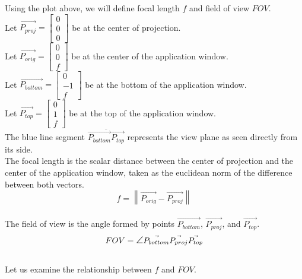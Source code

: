 \documentclass[11.pt]{article}
\begin{document}
Using the plot above, we will define focal length $f$ and
field of view $FOV$.\\

Let $\vec{P_{proj}}=\begin{bmatrix} 0\\ 0\\ 0\end{bmatrix}$ be at the center
of projection.\\[5pt]

Let $\vec{P_{orig}}=\begin{bmatrix} 0\\ 0\\ f\end{bmatrix}$ be at the center of the
application window.\\[5pt]

Let $\vec{P_{bottom}}=\begin{bmatrix} 0\\ -1\\ f\end{bmatrix}$ be at the bottom of the
application window.\\[5pt]

Let $\vec{P_{top}}=\begin{bmatrix} 0\\ 1\\ f\end{bmatrix}$ be at the top of the
application window.\\[5pt]

The blue line segment $\overline{\vec{P_{bottom}}\vec{P_{top}}}$ represents the view
plane as seen directly from its side.\\

The focal length is the scalar distance between the center of projection and the
center of the application window, taken as the euclidean norm of the difference between 
both vectors.\\

$$ f = \left\lVert \vec{P_{orig}}-\vec{P_{proj}} \right\rVert$$\\

The field of view is the angle formed by points $\vec{P_{bottom}}$,
$\vec{P_{proj}}$, and $\vec{P_{top}}$.\\

$$ FOV = \mathlarger{\angle} \vec{P_{bottom}}\vec{P_{proj}}\vec{P_{top}}$$\\

Let us examine the relationship between $f$ and $FOV$.\\
\end{document}
